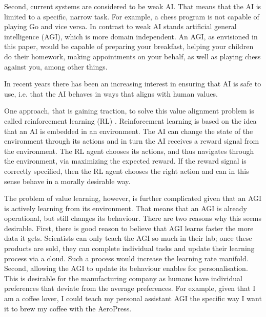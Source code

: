 Second, current systems are considered to be weak AI. That means that the AI is limited to a specific, narrow task. For example, a chess program is not capable of playing Go and vice versa. In contrast to weak AI stands artificial general intelligence (AGI), which is more domain independent. An AGI, as envisioned in this paper, would be capable of preparing your breakfast, helping your children do their homework, making appointments on your behalf, as well as playing chess against you, among other things. 

In recent years there has been an increasing interest in ensuring that AI is safe to use, i.e. that the AI behaves in ways that aligns with human values.

One approach, that is gaining traction, to solve this value alignment problem is called reinforcement learning (RL) \citep{soares2015value}. Reinforcement learning is based on the idea that an AI is embedded in an environment. The AI can change the state of the environment through its actions and in turn the AI receives a reward signal from the environment. The RL agent chooses its actions, and thus navigates through the environment, via maximizing the expected reward. If the reward signal is correctly specified, then the RL agent chooses the right action and can in this sense behave in a morally desirable way.

The problem of value learning, however, is further complicated given that an AGI is actively learning from its environment. That means that an AGI is already operational, but still changes its behaviour. There are two reasons why this seems desirable. First, there is good reason to believe that AGI learns faster the more data it gets. Scientists can only teach the AGI so much in their lab; once these products are sold, they can complete individual tasks and update their learning process via a cloud. Such a process would increase the learning rate manifold. Second, allowing the AGI to update its behaviour enables for personalisation. This is desirable for the manufacturing company as humans have individual preferences that deviate from the average preferences. For example, given that I am a coffee lover, I could teach my personal assistant AGI the specific way I want it to brew my coffee with the AeroPress.  



